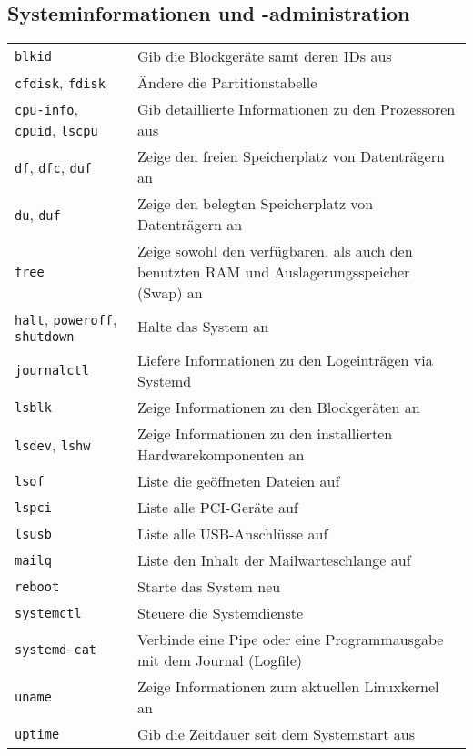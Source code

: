 \documentclass[10pt,a4paper]{article}
\begin{document}
\cheatsheet

\begin{multicols}{2}

\section{Systeminformationen und -administration}
\begin{tabular}{ p{2.5cm} p{8.5cm} }
  \hline
  \texttt{blkid} & Gib die Blockgeräte samt deren IDs aus\\
  \rowcolor{Gray}
  \texttt{cfdisk}, \texttt{fdisk} & Ändere die Partitionstabelle \\
  \texttt{cpu-info}, \texttt{cpuid}, \texttt{lscpu} & Gib detaillierte Informationen zu den Prozessoren aus \\
  \rowcolor{Gray}
  \texttt{df}, \texttt{dfc}, \texttt{duf} & Zeige den freien Speicherplatz von Datenträgern an \\
  \texttt{du}, \texttt{duf} & Zeige den belegten Speicherplatz von Datenträgern an \\
  \rowcolor{Gray}
  \texttt{free} & Zeige sowohl den verfügbaren, als auch den benutzten RAM und Auslagerungsspeicher (Swap) an\\
  \texttt{halt}, \texttt{poweroff}, \texttt{shutdown} & Halte das System an\\
  \rowcolor{Gray}
  \texttt{journalctl} & Liefere Informationen zu den Logeinträgen via Systemd \\
  \texttt{lsblk} & Zeige Informationen zu den Blockgeräten an\\
  \rowcolor{Gray}
  \texttt{lsdev}, \texttt{lshw} & Zeige Informationen zu den installierten Hardwarekomponenten an\\
  \texttt{lsof} & Liste die geöffneten Dateien auf \\
  \rowcolor{Gray}
  \texttt{lspci} & Liste alle PCI-Geräte auf\\
  \texttt{lsusb} & Liste alle USB-Anschlüsse auf\\
  \rowcolor{Gray}
  \texttt{mailq} & Liste den Inhalt der Mailwarteschlange auf \\
  \texttt{reboot} & Starte das System neu\\
  \rowcolor{Gray}
  \texttt{systemctl} & Steuere die Systemdienste \\
  \texttt{systemd-cat} & Verbinde eine Pipe oder eine Programm\-ausgabe mit dem Journal (Logfile) \\
  \rowcolor{Gray}
  \texttt{uname} & Zeige Informationen zum aktuellen Linux\-kernel an \\
  \texttt{uptime} & Gib die Zeitdauer seit dem Systemstart aus \\
  \hline
\end{tabular}


\end{multicols}
\end{document}
